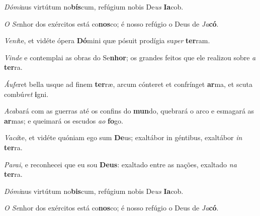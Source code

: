 \begin{greenumerate}
  \switchcolumn*


  \item \textit{Dómi}nus virtútum no\textbf{bís}cum, {\GreStar} refúgium nobis De\-\textit{us} \textbf{Ia}cob. 

  \switchcolumn%

  \item \textit{O Se}nhor dos exércitos está co\textbf{nos}co; {\GreStar} é nosso refúgio o Deus de \textit{Ja}\textbf{có}. 

  \switchcolumn*


  \item \textit{Vení}te, et vidéte ópera \textbf{Dó}mini {\GreStar} quæ pósuit prodígia su\textit{per} \textbf{ter}ram. 

  \switchcolumn%

  \item \textit{Vinde} e contemplai as obras do Se\textbf{nhor}; {\GreStar} os grandes feitos que ele realizou sobre \textit{a} \textbf{ter}ra. 

  \switchcolumn*


  \item \textit{Áufe}ret bella usque ad finem \textbf{ter}ræ, {\GreDagger} arcum cónteret et confrínget \textbf{ar}ma, {\GreStar} et scuta combú\textit{ret} \textbf{i}gni. 

  \switchcolumn%

  \item \textit{Aca}bará com as guerras até os confins do \textbf{mun}do, {\GreDagger} quebrará o arco e esmagará as \textbf{ar}mas; {\GreStar} e queimará os escudos \textit{ao} \textbf{fo}go. 

  \switchcolumn*


  \item \textit{Vacá}te, et vidéte quóniam ego sum \textbf{De}us; {\GreStar} exaltábor in géntibus, exaltábor \textit{in} \textbf{ter}ra. 

  \switchcolumn%

  \item \textit{Parai}, e reconhecei que eu sou \textbf{Deus}: {\GreStar} exaltado entre as nações, exaltado \textit{na} \textbf{ter}ra. 

  \switchcolumn*


  \item \textit{Dómi}nus virtútum no\textbf{bis}cum, {\GreStar} refúgium nobis De\-\textit{us} \textbf{Ia}cob. 

  \switchcolumn%

  \item \textit{O Se}nhor dos exércitos está co\textbf{nos}co; {\GreStar} é nosso refúgio o Deus de \textit{Ja}\textbf{có}. 
\end{greenumerate}